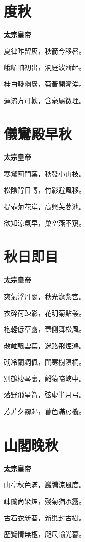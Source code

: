 \documentclass[12pt,a4paper]{ctexbook}
\begin{document}
\section{度秋}
\textbf{太宗皇帝}\par\vspace{0.5em}
夏律昨留灰，秋箭今移晷。\par
峨嵋岫初出，洞庭波漸起。\par
桂白發幽巖，菊黃開灞涘。\par
運流方可歎，含毫屬微理。\par

\section{儀鸞殿早秋}
\textbf{太宗皇帝}\par\vspace{0.5em}
寒驚薊門葉，秋發小山枝。\par
松陰背日轉，竹影避風移。\par
提壺菊花岸，高興芙蓉池。\par
欲知涼氣早，巢空燕不窺。\par

\section{秋日即目}
\textbf{太宗皇帝}\par\vspace{0.5em}
爽氣浮丹闕，秋光澹紫宮。\par
衣碎荷疎影，花明菊點叢。\par
袍輕低草露，蓋側舞松風。\par
散岫飄雲葉，迷路飛煙鴻。\par
砌冷蘭凋佩，閨寒樹隕桐。\par
別鶴棲琴裏，離猿啼峽中。\par
落野飛星箭，弦虛半月弓。\par
芳菲夕霧起，暮色滿房櫳。\par

\section{山閣晚秋}
\textbf{太宗皇帝}\par\vspace{0.5em}
山亭秋色滿，巖牖涼風度。\par
疎蘭尚染煙，殘菊猶承露。\par
古石衣新苔，新巢封古樹。\par
歷覽情無極，咫尺輸光暮。\par
\end{document}
